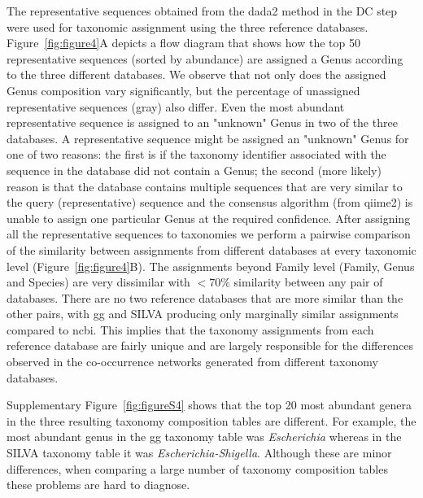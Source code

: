   The representative sequences obtained from the \ac{dada2} method in the DC step were used for taxonomic assignment using the three reference databases.
  Figure~\ref{fig:figure4}A depicts a flow diagram that shows how the top 50 representative sequences (sorted by abundance) are assigned a Genus according to the three different databases.
  We observe that not only does the assigned Genus composition vary significantly, but the percentage of unassigned representative sequences (gray) also differ.
  Even the most abundant representative sequence is assigned to an "unknown" Genus in two of the three databases.
  A representative sequence might be assigned an "unknown" Genus for one of two reasons: the first is if the taxonomy identifier associated with the sequence in the database did not contain a Genus; the second (more likely) reason is that the database contains multiple sequences that are very similar to the query (representative) sequence and the consensus algorithm (from \ac{qiime2}) is unable to assign one particular Genus at the required confidence.
  After assigning all the representative sequences to taxonomies we perform a pairwise comparison of the similarity between assignments from different databases at every taxonomic level (Figure~\ref{fig:figure4}B).
  The assignments beyond Family level (Family, Genus and Species) are very dissimilar with $<70\%$ similarity between any pair of databases.
  There are no two reference databases that are more similar than the other pairs, with \ac{gg} and SILVA producing only marginally similar assignments compared to \ac{ncbi}.
  This implies that the taxonomy assignments from each reference database are fairly unique and are largely responsible for the differences observed in the co-occurrence networks generated from different taxonomy databases.

  Supplementary Figure~\ref{fig:figureS4} shows that the top 20 most abundant genera in the three resulting taxonomy composition tables are different.
  For example, the most abundant genus in the \ac{gg} taxonomy table was \textit{Escherichia} whereas in the SILVA taxonomy table it was \textit{Escherichia-Shigella}.
  Although these are minor differences, when comparing a large number of taxonomy composition tables these problems are hard to diagnose.

